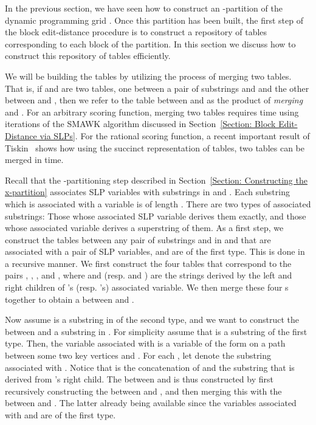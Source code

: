 

In the previous section, we have
seen how to construct an -partition of the
dynamic programming grid . Once this partition has been
built, the first step of the block edit-distance procedure is
to construct a repository of  tables corresponding to
each block of the partition. In this section we discuss how to
construct this repository of  tables efficiently.

We will be building the  tables by utilizing the process
of merging two  tables. That is, if  and  are
two  tables, one between a pair of substrings  and
 and the other between  and , then we refer to the
 table between  and  as the product of
\emph{merging}  and . For an arbitrary scoring
function, merging two   tables requires 
time using  iterations of the SMAWK algorithm discussed in
Section~\ref{Section: Block Edit-Distance via SLPs}. For the
rational scoring function, a recent important result of
Tiskin~\cite{Tiskin2009} shows how using the succinct
representation of  tables, two  tables can be
merged in  time.

Recall that the -partitioning step described in
Section~\ref{Section: Constructing the x-partition}
associates SLP variables with substrings in  and . Each
substring which is associated with a variable is of length
. There are two types of associated substrings: Those
whose associated SLP variable derives them exactly, and those
whose associated variable derives a superstring of them. As a first step, we construct the
 tables between any pair of substrings  and  in
 and  that are associated with a pair of SLP variables,
and are of the first type.
This is done in a recursive manner. We first construct
the  four  tables that correspond to
the pairs , , , and
, where  and  (resp.  and ) are the strings derived by the left and right
children of 's (resp. 's) associated variable.
We then merge these four s together
to obtain a  between  and .


Now assume  is a substring in  of the second type, and
we want to construct the  between  and a substring
 in . For simplicity assume that  is a substring of
the first type. Then, the variable associated with  is a
variable of the form  on a path between some two key
vertices  and .
For each ,
let  denote the substring associated with  . Notice that  is the concatenation of  and the substring  that is derived from 's right child.
The 
between  and  is thus constructed by first recursively
constructing the  between  and ,
and then merging this with the  between  and .
The latter already being available since the variables associated with  and  are of the first type.









